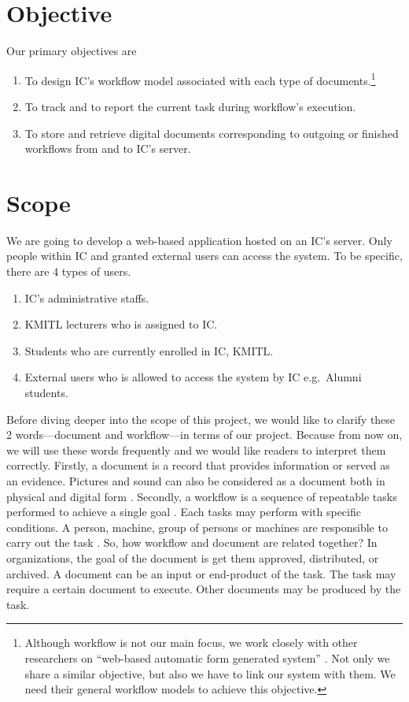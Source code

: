 \section{Objective}
Our primary objectives are
\begin{enumerate}
\item To design IC's workflow model associated with each type of documents.\footnote{
	Although workflow is not our main focus, we work closely with other researchers on \enquote{web-based automatic form generated system} \cite{web-based-form}.
	Not only we share a similar objective, but also we have to link our system with them.
	We need their general workflow models to achieve this objective.
	}
\item To track and to report the current task during workflow's execution.
\item To store and retrieve digital documents corresponding to outgoing or finished workflows from and to IC's server.
\end{enumerate}

\section{Scope}
We are going to develop a web-based application hosted on an IC's server.
Only people within IC and granted external users can access the system.
To be specific, there are 4 types of users.
\begin{enumerate}
\item IC's administrative staffs.
\item KMITL lecturers who is assigned to IC.
\item Students who are currently enrolled in IC, KMITL.
\item External users who is allowed to access the system by IC e.g.\ Alumni students.
\end{enumerate}

Before diving deeper into the scope of this project, we would like to clarify these 2 words---document and workflow---in terms of our project. %
Because from now on, we will use these words frequently and we would like readers to interpret them correctly.
Firstly, a document is a record that provides information or served as an evidence. 
Pictures and sound can also be considered as a document both in physical and digital form \cite{oxdict:document,whatis:document}. 
Secondly, a workflow is a sequence of repeatable tasks performed to achieve a single goal \cite{Jablonski:1996:WMM}. 
Each tasks may perform with specific conditions.
A person, machine, group of persons or machines are responsible to carry out the task \cite{wfMangement}. 
So, how workflow and document are related together?
In organizations, the goal of the document is get them approved, distributed, or archived.
A document can be an input or end-product of the task.
The task may require a certain document to execute.
Other documents may be produced by the task.

